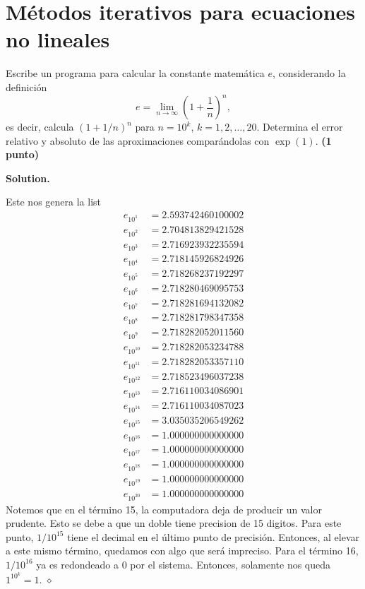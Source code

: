 \documentclass{article}
\theoremstyle{problemstyle}
\newenvironment{solution}{%
  \begin{mdframed}[linewidth=0.8pt,linecolor=Gray,backgroundcolor=Gray!5,roundcorner=5pt]%
  \noindent\textbf{Solution.}%
}{%
\hfill $ \diamond $ 
  \end{mdframed}%
}
\begin{document}
\section*{M\'etodos iterativos para ecuaciones no lineales}\label{chap:m_etodos_iterativos_para_ecuaciones_no_lineales} %

\begin{problem}
Escribe un programa para calcular la constante matem\'atica $ e $, considerando la definici\'on
\[
	e = \lim_{n\to\infty} \left(1+\frac{1}{n}\right)^{n},
\]
es decir, calcula $ (1+1/n)^n $ para $ n = 10^k $, $ k = 1, 2,\dots, 20. $ Determina el error relativo y absoluto de las aproximaciones compar\'andolas con $ \exp(1) $. \textbf{(1 punto)}
\end{problem}
\begin{solution}
	

	Este nos genera la list
	\begin{align*}
    e_{10^{1}} &= 2.593742460100002\\
    e_{10^{2}} &= 2.704813829421528\\
    e_{10^{3}} &= 2.716923932235594\\
    e_{10^{4}} &= 2.718145926824926\\
    e_{10^{5}} &= 2.718268237192297\\
    e_{10^{6}} &= 2.718280469095753\\
    e_{10^{7}} &= 2.718281694132082\\
    e_{10^{8}} &= 2.718281798347358\\
    e_{10^{9}} &= 2.718282052011560\\
    e_{10^{10}} &= 2.718282053234788\\
    e_{10^{11}} &= 2.718282053357110\\
    e_{10^{12}} &= 2.718523496037238\\
    e_{10^{13}} &= 2.716110034086901\\
    e_{10^{14}} &= 2.716110034087023\\
    e_{10^{15}} &= 3.035035206549262\\
    e_{10^{16}} &= 1.000000000000000\\
    e_{10^{17}} &= 1.000000000000000\\
    e_{10^{18}} &= 1.000000000000000\\
    e_{10^{19}} &= 1.000000000000000\\
    e_{10^{20}} &= 1.000000000000000
	\end{align*}
  Notemos que en el t\'ermino 15, la computadora deja de producir un valor prudente. Esto se debe a que un doble tiene precision de 15 digitos. Para este punto, $1/10^{15}$ tiene el decimal en el \'ultimo punto de precisi\'on. Entonces, al elevar a este mismo t\'ermino, quedamos con algo que ser\'a impreciso. Para el t\'ermino 16, $1/10^{16}$ ya es redondeado a 0 por el sistema. Entonces, solamente nos queda $ 1^{10^k} = 1 $.
\end{solution}
\end{document}

